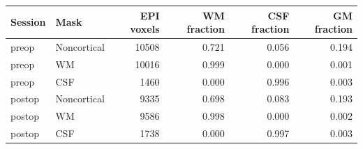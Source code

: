 \begin{tabular}{llrrrr}
\toprule
Session & Mask & EPI voxels & WM fraction & CSF fraction & GM fraction \\
\midrule
preop & Noncortical & 10508 & 0.721 & 0.056 & 0.194 \\
preop & WM & 10016 & 0.999 & 0.000 & 0.001 \\
preop & CSF & 1460 & 0.000 & 0.996 & 0.003 \\
postop & Noncortical & 9335 & 0.698 & 0.083 & 0.193 \\
postop & WM & 9586 & 0.998 & 0.000 & 0.002 \\
postop & CSF & 1738 & 0.000 & 0.997 & 0.003 \\
\bottomrule
\end{tabular}
